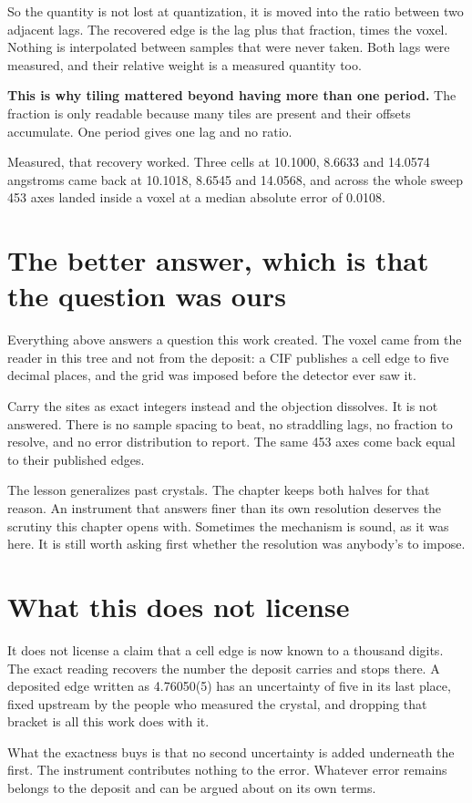 So the quantity is not lost at quantization, it is moved into the ratio between two adjacent lags. The recovered edge is the lag plus that fraction, times the voxel. Nothing is interpolated between samples that were never taken. Both lags were measured, and their relative weight is a measured quantity too.

\textbf{This is why tiling mattered beyond having more than one period.} The fraction is only readable because many tiles are present and their offsets accumulate. One period gives one lag and no ratio.

Measured, that recovery worked. Three cells at 10.1000, 8.6633 and 14.0574 angstroms came back at 10.1018, 8.6545 and 14.0568, and across the whole sweep 453 axes landed inside a voxel at a median absolute error of 0.0108.

\section{The better answer, which is that the question was ours}

Everything above answers a question this work created. The voxel came from the reader in this tree and not from the deposit: a CIF publishes a cell edge to five decimal places, and the grid was imposed before the detector ever saw it.

Carry the sites as exact integers instead and the objection dissolves. It is not answered. There is no sample spacing to beat, no straddling lags, no fraction to resolve, and no error distribution to report. The same 453 axes come back equal to their published edges.

The lesson generalizes past crystals. The chapter keeps both halves for that reason. An instrument that answers finer than its own resolution deserves the scrutiny this chapter opens with. Sometimes the mechanism is sound, as it was here. It is still worth asking first whether the resolution was anybody's to impose.

\section{What this does not license}

It does not license a claim that a cell edge is now known to a thousand digits. The exact reading recovers the number the deposit carries and stops there. A deposited edge written as 4.76050(5) has an uncertainty of five in its last place, fixed upstream by the people who measured the crystal, and dropping that bracket is all this work does with it.

What the exactness buys is that no second uncertainty is added underneath the first. The instrument contributes nothing to the error. Whatever error remains belongs to the deposit and can be argued about on its own terms.
